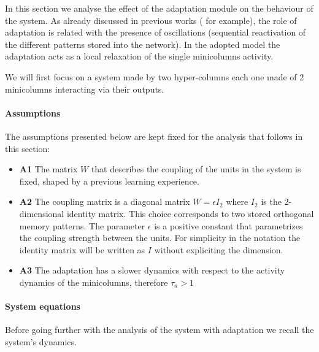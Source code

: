 In this section we analyse the effect of the adaptation module on the behaviour of the system. As already discussed in previous works (\cite{sandberg2002bayesian} for example), the role of adaptation is related with the presence of oscillations (sequential reactivation of the different patterns stored into the network). In the adopted model \cite{LansnerFRC} the adaptation acts as a local relaxation of the single minicolumns activity. 
 
 We will first focus on a system made by two hyper-columns each one made of 2 minicolumns interacting via their outputs.
 
 \paragraph{Assumptions}
 The assumptions presented below are kept fixed for the analysis that follows in this section:
 \begin{itemize}
     \item \textbf{A1} The matrix $W$ that describes the coupling of the units in the system is fixed, shaped by a previous learning experience.
     \item \textbf{A2} The coupling matrix is a diagonal matrix $W = \epsilon  I_{2}$ where $I_{2}$ is the 2-dimensional identity matrix. This choice corresponds to two stored orthogonal memory patterns. The parameter $\epsilon$ is a positive constant that parametrizes the coupling strength between the units. For simplicity in the notation the identity matrix will be written as $I$ without expliciting the dimension.
     \item \textbf{A3} The adaptation has a slower dynamics with respect to the activity dynamics of the minicolumns, therefore $\tau_a > 1$
 \end{itemize}
 
 \paragraph{System equations}
 Before going further with the analysis of the system with adaptation we recall the system's dynamics.
 

